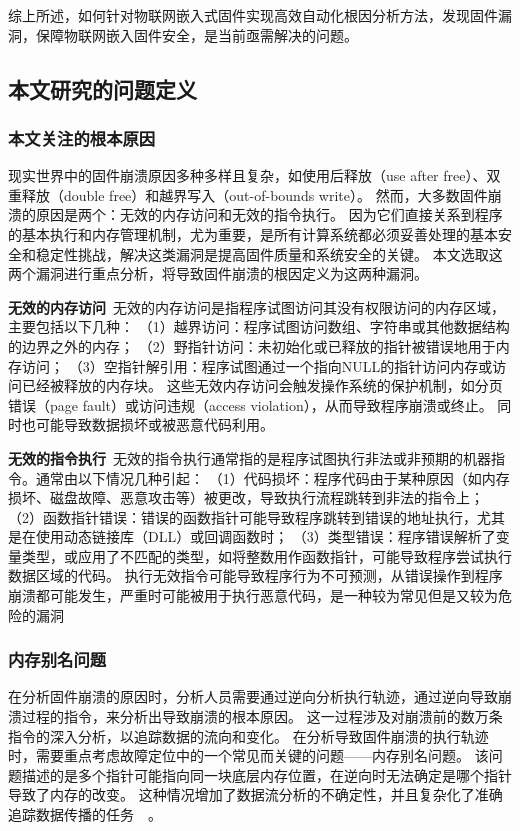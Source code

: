 综上所述，如何针对物联网嵌入式固件实现高效自动化根因分析方法，发现固件漏洞，保障物联网嵌入固件安全，是当前亟需解决的问题。

\subsection{本文研究的问题定义}             %
\subsubsection{本文关注的根本原因}          %
现实世界中的固件崩溃原因多种多样且复杂，如使用后释放（use after free）、双重释放（double free）和越界写入（out-of-bounds write）。
然而，大多数固件崩溃的原因是两个：无效的内存访问和无效的指令执行。
因为它们直接关系到程序的基本执行和内存管理机制，尤为重要，是所有计算系统都必须妥善处理的基本安全和稳定性挑战，解决这类漏洞是提高固件质量和系统安全的关键。
本文选取这两个漏洞进行重点分析，将导致固件崩溃的根因定义为这两种漏洞。

\textbf{无效的内存访问}\ 无效的内存访问是指程序试图访问其没有权限访问的内存区域，主要包括以下几种：
（1）越界访问：程序试图访问数组、字符串或其他数据结构的边界之外的内存；
（2）野指针访问：未初始化或已释放的指针被错误地用于内存访问；
（3）空指针解引用：程序试图通过一个指向NULL的指针访问内存或访问已经被释放的内存块。
这些无效内存访问会触发操作系统的保护机制，如分页错误（page fault）或访问违规（access violation），从而导致程序崩溃或终止。
同时也可能导致数据损坏或被恶意代码利用。

\textbf{无效的指令执行}\ 无效的指令执行通常指的是程序试图执行非法或非预期的机器指令。通常由以下情况几种引起：
（1）代码损坏：程序代码由于某种原因（如内存损坏、磁盘故障、恶意攻击等）被更改，导致执行流程跳转到非法的指令上；
（2）函数指针错误：错误的函数指针可能导致程序跳转到错误的地址执行，尤其是在使用动态链接库（DLL）或回调函数时；
（3）类型错误：程序错误解析了变量类型，或应用了不匹配的类型，如将整数用作函数指针，可能导致程序尝试执行数据区域的代码。
执行无效指令可能导致程序行为不可预测，从错误操作到程序崩溃都可能发生，严重时可能被用于执行恶意代码，是一种较为常见但是又较为危险的漏洞

\subsubsection{内存别名问题}                %
在分析固件崩溃的原因时，分析人员需要通过逆向分析执行轨迹，通过逆向导致崩溃过程的指令，来分析出导致崩溃的根本原因。
这一过程涉及对崩溃前的数万条指令的深入分析，以追踪数据的流向和变化。
在分析导致固件崩溃的执行轨迹时，需要重点考虑故障定位中的一个常见而关键的问题——内存别名问题。
该问题描述的是多个指针可能指向同一块底层内存位置，在逆向时无法确定是哪个指针导致了内存的改变。
这种情况增加了数据流分析的不确定性，并且复杂化了准确追踪数据传播的任务~\cite{REPT}~\cite{RETracer2016}。

